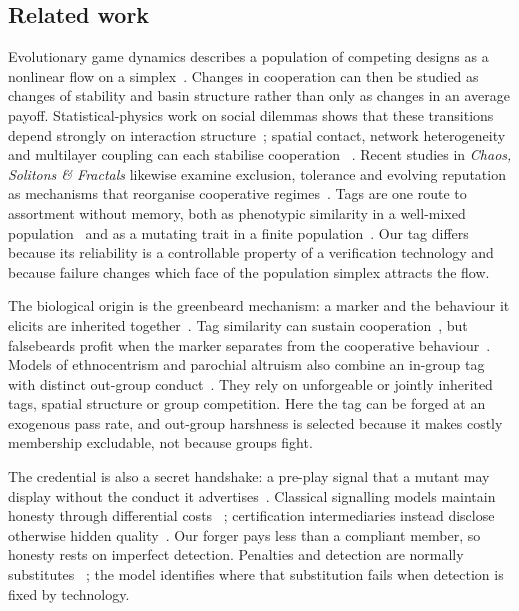 \subsection{Related work}
\label{sec:related}

Evolutionary game dynamics describes a population of competing designs as a
nonlinear flow on a simplex~\citep{taylor1978ess,hofbauer1998evolutionary,hofbauer2003evolutionary}.
Changes in cooperation can then be studied as changes of stability and basin
structure rather than only as changes in an average payoff. Statistical-physics
work on social dilemmas shows that these transitions depend strongly on
interaction structure~\citep{perc2017statphys}; spatial contact, network
heterogeneity and multilayer coupling can each stabilise cooperation
~\citep{nowak1992spatial,santos2005scale,wang2015multilayer}. Recent studies in
\emph{Chaos, Solitons \& Fractals} likewise examine exclusion, tolerance and
evolving reputation as mechanisms that reorganise cooperative
regimes~\citep{ren2021tolerance,zhang2023expulsion,yue2025reputation}. Tags are
one route to assortment without memory, both as phenotypic similarity in a
well-mixed population~\citep{antal2009phenotypic} and as a mutating trait in a
finite population~\citep{traulsen2007chromodynamics}. Our tag differs because
its reliability is a controllable property of a verification technology and
because failure changes which face of the population simplex attracts the
flow.

The biological origin is the greenbeard mechanism: a marker and the behaviour
it elicits are inherited together~\citep{hamilton1964genetical1,dawkins1976selfish}.
Tag similarity can sustain cooperation~\citep{riolo2001evolution}, but
falsebeards profit when the marker separates from the cooperative
behaviour~\citep{jansen2006altruism,gardner2010greenbeards}. Models of
ethnocentrism and parochial altruism also combine an in-group tag with distinct
out-group conduct~\citep{hammond2006ethnocentrism,choi2007parochial}. They rely
on unforgeable or jointly inherited tags, spatial structure or group
competition. Here the tag can be forged at an exogenous pass rate, and
out-group harshness is selected because it makes costly membership excludable,
not because groups fight.

The credential is also a secret handshake: a pre-play signal that a mutant may
display without the conduct it advertises~\citep{robson1990efficiency}.
Classical signalling models maintain honesty through differential costs
~\citep{grafen1990biological,spence1973job}; certification intermediaries
instead disclose otherwise hidden quality~\citep{dranove2010quality}. Our
forger pays less than a compliant member, so honesty rests on imperfect
detection. Penalties and detection are normally substitutes
~\citep{becker1968crime}; the model identifies where that substitution fails
when detection is fixed by technology.

